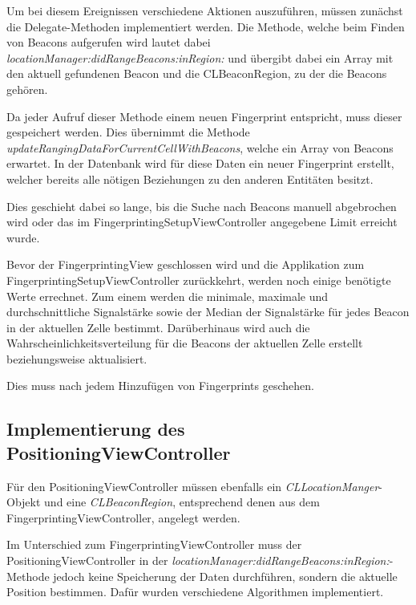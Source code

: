 Um bei diesem Ereignissen verschiedene Aktionen auszuführen, müssen zunächst die Delegate-Methoden implementiert werden. Die Methode, welche beim Finden von Beacons aufgerufen wird lautet dabei \emph{locationManager:didRangeBeacons:inRegion:} und übergibt dabei ein Array mit den aktuell gefundenen Beacon und die CLBeaconRegion, zu der die Beacons gehören.

Da jeder Aufruf dieser Methode einem neuen Fingerprint entspricht, muss dieser gespeichert werden. 
Dies übernimmt die Methode \emph{updateRangingDataForCurrentCellWithBeacons}, welche ein Array von Beacons erwartet. In der Datenbank wird für diese Daten ein neuer Fingerprint erstellt, welcher bereits alle nötigen Beziehungen zu den anderen Entitäten besitzt. 

Dies geschieht dabei so lange, bis die Suche nach Beacons manuell abgebrochen wird oder das im FingerprintingSetupViewController angegebene Limit erreicht wurde. 

Bevor der FingerprintingView geschlossen wird und die Applikation zum FingerprintingSetupViewController zurückkehrt, werden noch einige benötigte Werte errechnet.
Zum einem werden die minimale, maximale und durchschnittliche Signalstärke sowie der Median der Signalstärke für jedes Beacon in der aktuellen Zelle bestimmt. 
Darüberhinaus wird auch die Wahrscheinlichkeitsverteilung für die Beacons der aktuellen Zelle erstellt beziehungsweise aktualisiert.

Dies muss nach jedem Hinzufügen von Fingerprints geschehen.



\subsection{Implementierung des PositioningViewController}
\label{sec:}

Für den PositioningViewController müssen ebenfalls ein \emph{CLLocationManger}-Objekt und eine \emph{CLBeaconRegion}, entsprechend denen aus dem FingerprintingViewController, angelegt werden.

Im Unterschied zum FingerprintingViewController muss der PositioningViewController in der \emph{locationManager:didRangeBeacons:inRegion:}-Methode jedoch keine Speicherung der Daten durchführen, sondern die aktuelle Position bestimmen. Dafür wurden verschiedene Algorithmen implementiert.

